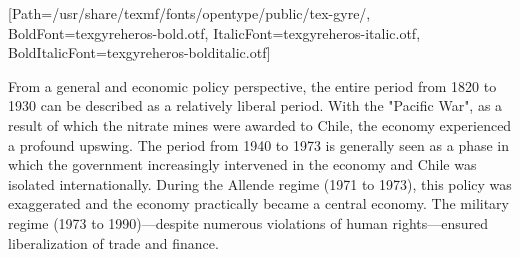 \documentclass[varwidth]{standalone}
\begin{document}
\setmainfont{texgyreheros-regular.otf}%
[Path=/usr/share/texmf/fonts/opentype/public/tex-gyre/,
 BoldFont=texgyreheros-bold.otf,
 ItalicFont=texgyreheros-italic.otf,
 BoldItalicFont=texgyreheros-bolditalic.otf]
\fontsize{12}{14.4}
\selectfont{}
\setmainfont{Lato Light}
\fontsize{12pt}{17pt}\selectfont
\setlength{\columnsep}{1cm}
\begin{minipage}[t]{16.25cm}
\begin{multicols}{2} 
From a general and economic policy perspective, the entire period from
1820 to 1930 can be described as a relatively liberal period. With the
"Pacific War", as a result of which the nitrate mines were awarded to
Chile, the economy experienced a profound upswing. The period from
1940 to 1973 is generally seen as a phase in which the government
increasingly intervened in the economy and Chile was isolated
internationally. During the Allende regime (1971 to 1973), this policy
was exaggerated and the economy practically became a central
economy. The military regime (1973 to 1990)---despite numerous
violations of human rights---ensured liberalization of trade and
finance.
\end{multicols}
\end{minipage} 
\end{document}
